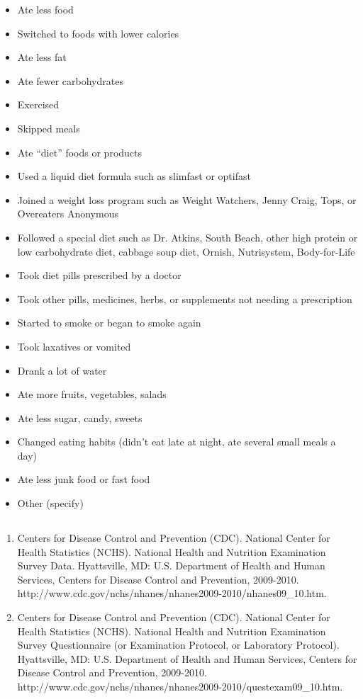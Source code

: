 \documentclass{article}
\begin{document}
\begin{itemize}[noitemsep]
\item Ate less food
\item Switched to foods with lower calories
\item Ate less fat
\item Ate fewer carbohydrates
\item Exercised
\item Skipped meals
\item Ate ``diet'' foods or products
\item Used a liquid diet formula such as slimfast or optifast
\item Joined a weight loss program such as Weight Watchers, Jenny Craig, Tops, or Overeaters Anonymous
\item Followed a special diet such as Dr. Atkins, South Beach, other high protein or low carbohydrate diet, cabbage soup diet, Ornish, Nutrisystem, Body-for-Life
\item Took diet pills prescribed by a doctor
\item Took other pills, medicines, herbs, or supplements not needing a prescription
\item Started to smoke or began to smoke again
\item Took laxatives or vomited
\item Drank a lot of water
\item Ate more fruits, vegetables, salads
\item Ate less sugar, candy, sweets
\item Changed eating habits (didn't eat late at night, ate several small meals a day)
\item Ate less junk food or fast food
\item Other (specify)
\end{itemize}

\subsection*{}
\begin{enumerate}
	\item Centers for Disease Control and Prevention (CDC). National Center for Health Statistics (NCHS). National Health and Nutrition Examination Survey Data. Hyattsville, MD: U.S. Department of Health and Human Services, Centers for Disease Control and Prevention, 2009-2010. \\ http://www.cdc.gov/nchs/nhanes/nhanes2009-2010/nhanes09\_10.htm.
	\item Centers for Disease Control and Prevention (CDC). National Center for Health Statistics (NCHS). National Health and Nutrition Examination Survey Questionnaire (or Examination Protocol, or Laboratory Protocol). Hyattsville, MD: U.S. Department of Health and Human Services, Centers for Disease Control and Prevention, 2009-2010. \\ http://www.cdc.gov/nchs/nhanes/nhanes2009-2010/questexam09\_10.htm.
\end{enumerate}
\end{document}
